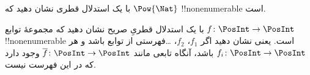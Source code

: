 \documentclass[../../../include/open-logic-section]{subfiles}
\begin{document}
\begin{prob}
با یک استدلال قطری نشان دهید که $\Pow{\Nat}$ !!{nonenumerable} است.
\end{prob}

\begin{prob}\label{sfr:siz:nen:prob:f-posint}
با یک استدلال قطریِ صریح نشان دهید که مجموعهٔ توابع
$f \colon \PosInt \to \PosInt$ !!{nonenumerable} است. یعنی نشان دهید
اگر $f_1$، $f_2$، \dots فهرستی از توابع باشد و هر $f_i\colon
\PosInt \to \PosInt$ باشد، آنگاه تابعی مانند $\overline{f}\colon \PosInt \to
\PosInt$ وجود دارد که در این فهرست نیست.
\end{prob}
\end{document}
